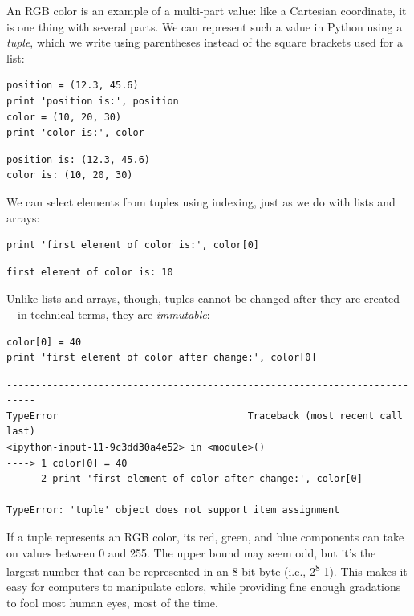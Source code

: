 \documentclass[]{book}
\newcommand{\gdef}[2]{\emph{#2}}
\begin{document}
An RGB color is an example of a multi-part value: like a Cartesian
coordinate, it is one thing with several parts. We can represent such a
value in Python using a \gdef{g:tuple}{tuple}, which we write using
parentheses instead of the square brackets used for a list:

\begin{verbatim}
position = (12.3, 45.6)
print 'position is:', position
color = (10, 20, 30)
print 'color is:', color
\end{verbatim}

\begin{verbatim}
position is: (12.3, 45.6)
color is: (10, 20, 30)
\end{verbatim}

We can select elements from tuples using indexing, just as we do with
lists and arrays:

\begin{verbatim}
print 'first element of color is:', color[0]
\end{verbatim}

\begin{verbatim}
first element of color is: 10
\end{verbatim}

Unlike lists and arrays, though, tuples cannot be changed after they are
created---in technical terms, they are
\gdef{g:immutable}{immutable}:

\begin{verbatim}
color[0] = 40
print 'first element of color after change:', color[0]
\end{verbatim}

\begin{verbatim}
---------------------------------------------------------------------------
TypeError                                 Traceback (most recent call last)
<ipython-input-11-9c3dd30a4e52> in <module>()
----> 1 color[0] = 40
      2 print 'first element of color after change:', color[0]

TypeError: 'tuple' object does not support item assignment
\end{verbatim}

If a tuple represents an RGB color, its red, green, and blue components
can take on values between 0 and 255. The upper bound may seem odd, but
it's the largest number that can be represented in an 8-bit byte (i.e.,
2\textsuperscript{8}-1). This makes it easy for computers to manipulate
colors, while providing fine enough gradations to fool most human eyes,
most of the time.
\end{document}
